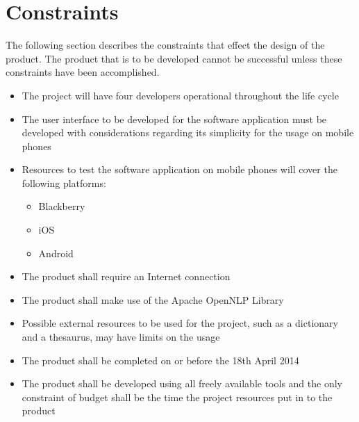 \newpage
\section{Constraints}

The following section describes the constraints that effect the design of the
product. The product that is to be developed cannot be successful unless these
constraints have been accomplished.

\begin{itemize}
	\item The project will have four developers operational throughout the life cycle
	\item The user interface to be developed for the software application must
be developed with considerations regarding its simplicity for the usage on mobile phones 
	\item Resources to test the software application on mobile phones will cover the following platforms:
		\begin{itemize}
			\item Blackberry
			\item iOS
			\item Android 
		\end{itemize}
	\item The product shall require an Internet connection
	\item The product shall make use of the Apache OpenNLP Library
	\item Possible external resources to be used for the project, such as a dictionary
 and a thesaurus, may have limits on the usage
	\item The product shall be completed on or before the 18th April 2014
	\item The product shall be developed using all freely available tools and the
 only constraint of budget shall be the time the project resources put in to the product
\end{itemize}


